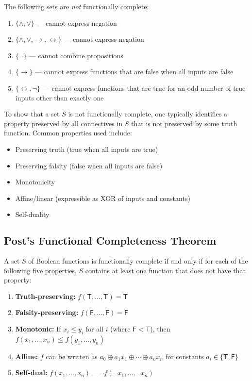 \begin{theorem}
The following sets are \emph{not} functionally complete:
\begin{enumerate}
  \item $\{\wedge, \vee\}$ — cannot express negation
  \item $\{\wedge, \vee, \rightarrow, \leftrightarrow\}$ — cannot express negation
  \item $\{\neg\}$ — cannot combine propositions
  \item $\{\rightarrow\}$ — cannot express functions that are false when all
        inputs are false
  \item $\{\leftrightarrow, \neg\}$ — cannot express functions that are true
        for an odd number of true inputs other than exactly one
\end{enumerate}
\end{theorem}

\begin{remark}
To show that a set $S$ is not functionally complete, one typically identifies
a property preserved by all connectives in $S$ that is not preserved by some
truth function. Common properties used include:
\begin{itemize}
  \item Preserving truth (true when all inputs are true)
  \item Preserving falsity (false when all inputs are false)
  \item Monotonicity
  \item Affine/linear (expressible as XOR of inputs and constants)
  \item Self-duality
\end{itemize}
\end{remark}

\subsection{Post's Functional Completeness Theorem}

\begin{theorem}
A set $S$ of Boolean functions is functionally complete if and only if for each
of the following five properties, $S$ contains at least one function that does
not have that property:

\begin{enumerate}
  \item \textbf{Truth-preserving:} $f(\mathsf{T}, \dots, \mathsf{T}) = \mathsf{T}$
  \item \textbf{Falsity-preserving:} $f(\mathsf{F}, \dots, \mathsf{F}) = \mathsf{F}$
  \item \textbf{Monotonic:} If $x_i \leq y_i$ for all $i$ (where $\mathsf{F} < \mathsf{T}$),
        then $f(x_1, \dots, x_n) \leq f(y_1, \dots, y_n)$
  \item \textbf{Affine:} $f$ can be written as $a_0 \oplus a_1 x_1 \oplus \cdots \oplus a_n x_n$
        for constants $a_i \in \{\mathsf{T}, \mathsf{F}\}$
  \item \textbf{Self-dual:} $f(x_1, \dots, x_n) = \neg f(\neg x_1, \dots, \neg x_n)$
\end{enumerate}
\end{theorem}

